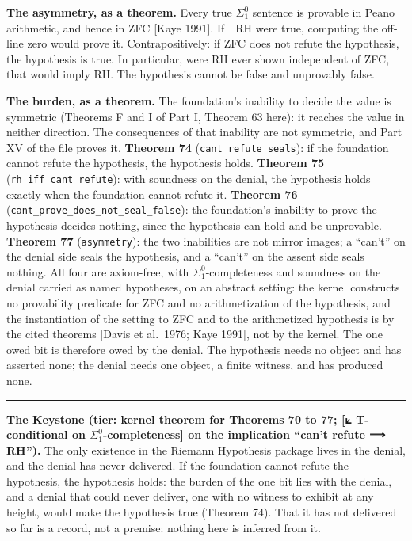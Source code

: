 \documentclass[10pt,twocolumn]{article}
\newcommand{\jboxstart}{\begin{jbox}}
\newenvironment{jbox}{\par\vspace{2pt}\noindent\color{accent}\rule{\columnwidth}{0.8pt}\par\vspace{-2pt}\small}{\par\vspace{2pt}}
\begin{document}
\textbf{The asymmetry, as a theorem.} Every true \(\Sigma^0_1\) sentence
is provable in Peano arithmetic, and hence in ZFC {[}Kaye 1991{]}. If
\(\neg\mathrm{RH}\) were true, computing the off-line zero would prove
it. Contrapositively: if ZFC does not refute the hypothesis, the
hypothesis is true. In particular, were RH ever shown independent of
ZFC, that would imply RH. The hypothesis cannot be false and unprovably
false.

\textbf{The burden, as a theorem.} The foundation's inability to decide
the value is symmetric (Theorems F and I of Part I, Theorem 63 here): it
reaches the value in neither direction. The consequences of that
inability are not symmetric, and Part XV of the file proves it.
\textbf{Theorem 74} (\texttt{cant\_refute\_seals}): if the foundation
cannot refute the hypothesis, the hypothesis holds. \textbf{Theorem 75}
(\texttt{rh\_iff\_cant\_refute}): with soundness on the denial, the
hypothesis holds exactly when the foundation cannot refute it.
\textbf{Theorem 76} (\texttt{cant\_prove\_does\_not\_seal\_false}): the
foundation's inability to prove the hypothesis decides nothing, since
the hypothesis can hold and be unprovable. \textbf{Theorem 77}
(\texttt{asymmetry}): the two inabilities are not mirror images; a
``can't'' on the denial side seals the hypothesis, and a ``can't'' on
the assent side seals nothing. All four are axiom-free, with
\(\Sigma^0_1\)-completeness and soundness on the denial carried as named
hypotheses, on an abstract setting: the kernel constructs no provability
predicate for ZFC and no arithmetization of the hypothesis, and the
instantiation of the setting to ZFC and to the arithmetized hypothesis
is by the cited theorems {[}Davis et al.~1976; Kaye 1991{]}, not by the
kernel. The one owed bit is therefore owed by the denial. The hypothesis
needs no object and has asserted none; the denial needs one object, a
finite witness, and has produced none.

\jboxstart

\textbf{The Keystone (tier: kernel theorem for Theorems 70 to 77; {[}⟀
T-conditional on \(\Sigma^0_1\)-completeness{]} on the implication
``can't refute ⟹ RH'').} The only existence in the Riemann Hypothesis
package lives in the denial, and the denial has never delivered. If the
foundation cannot refute the hypothesis, the hypothesis holds: the
burden of the one bit lies with the denial, and a denial that could
never deliver, one with no witness to exhibit at any height, would make
the hypothesis true (Theorem 74). That it has not delivered so far is a
record, not a premise: nothing here is inferred from it.
\end{document}
